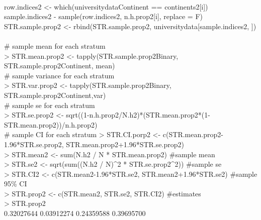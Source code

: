 \documentclass{article}
\begin{document}
\hspace{1mm} \textbraceleft\\
\hspace{1mm} row.indices2 \textless- which(universitydata\textdollar Continent == continents2[i])\\
\hspace{1mm} sample.indices2 \txetless- sample(row.indices2, n.h.prop2[i], replace = F)\\
\hspace{1mm} STR.sample.prop2 \textless- rbind(STR.sample.prop2, universitydata[sample.indices2, ])\\
\hspace{1mm} \textbraceright\\
\hspace{1mm} \# sample mean for each stratum\\
\textgreater\hspace{1mm} STR.mean.prop2 \textless- tapply(STR.sample.prop2\texttdollar Binary, STR.sample.prop2\textdollar Continent, mean)\\
\hspace{1mm} \# sample variance for each stratum\\
\textgreater\hspace{1mm} STR.var.prop2 \textless- tapply(STR.sample.prop2\textdollar Binary, STR.sample.prop2\textdollar Continent,var)\\
\hspace{1mm} \# sample se for each stratum\\
\textgreater\hspace{1mm} STR.se.prop2 \textless- sqrt((1-n.h.prop2/N.h2)*(STR.mean.prop2*(1-STR.mean.prop2))/n.h.prop2)\\
\hspace{1mm} \# sample CI for each stratum
\textgreater\hspace{1mm} STR.CI.porp2 \textless- c(STR.mean.prop2-1.96*STR.se.prop2, STR.mean.prop2+1.96*STR.se.prop2) \\
\textgreater\hspace{1mm} STR.mean2 \textless- sum(N.h2 / N * STR.mean.prop2) \#sample mean\\
\textgreater\hspace{1mm} STR.se2 \textless- sqrt(sum((N.h2 / N)\textasciicircum2 * STR.se.prop2\textasciicircum2)) \#sample se\\
\textgreater\hspace{1mm} STR.CI2 \textless- c(STR.mean2-1.96*STR.se2, STR.mean2+1.96*STR.se2) \#sample 95\% CI\\
\textgreater\hspace{1mm} STR.prop2 \textless- c(STR.mean2, STR.se2, STR.CI2) \#estimates\\
\textgreater\hspace{1mm} STR.prop2\\
\hspace{1mm} 0.32027644 0.03912274 0.24359588 0.39695700\\
\end{document}
